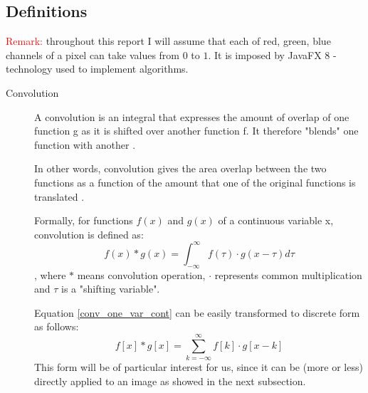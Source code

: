 \documentclass{article}
\begin{document}
\subsection{Definitions}
\label{definitions}
\textcolor{red}{Remark:} throughout this report I will assume that each of red, green, blue channels of a pixel can take values from $0$ to $1$. It is imposed by JavaFX 8 - technology used to implement algorithms.

\begin{description}

%
%
\item[Convolution]
A convolution is an integral that expresses the amount of overlap of one function g as it is shifted over another function f. It therefore "blends" one function with another  \cite{convolution_wolphram}. 

In other words, convolution gives the area overlap between the two functions as a function of the amount that one of the original functions is translated \cite{convolution_wiki}.

Formally, for functions $f(x)$ and $g(x)$ of a continuous variable x, convolution is defined as:
\begin{equation} \label{conv_one_var_cont}
f(x) * g(x) = \int_{-\infty}^{\infty} f(\tau) \cdot g(x - \tau) d\tau
\end{equation}
, where $*$ means convolution operation, $\cdot$ represents common multiplication and $\tau$ is a "shifting variable".

Equation \ref{conv_one_var_cont} can be easily transformed to discrete form as follows:
\begin{equation} \label{conv_one_var_disc}
f[x] * g[x] = \sum_{k=-\infty}^{\infty} f[k] \cdot g[x-k]
\end{equation}
This form will be of particular interest for us, since it can be (more or less) directly applied to an image as showed in the next subsection.


\end{description}
\end{document}
